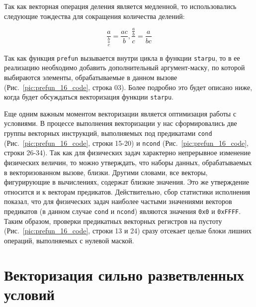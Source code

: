 \documentclass[utf8]{psta}
\begin{document}
Так как векторная операция деления является медленной, то использовались следующие тождества для сокращения количества делений:

\begin{equation}\label{eq:deldel}
\frac{a}{\frac{b}{c}} = \frac{ac}{b}, \frac{\frac{a}{b}}{c} = \frac{a}{bc}
\end{equation} 

Так как функция \texttt{prefun} вызывается внутри цикла в функции \texttt{starpu}, то в ее реализацию необходимо добавить дополнительный аргумент-маску, по которой выбираются элементы, обрабатываемые в данном вызове (Рис.~\ref{pic:prefun_16_code}, строка 03).
Более подробно это будет описано ниже, когда будет обсуждаться векторизация функции \texttt{starpu}.

Еще одним важным моментом векторизации является оптимизация работы с условиями.
В процессе выполнения векторизации у нас сформировались две группы векторных инструкций, выполняемых под предикатами \texttt{cond} (Рис.~\ref{pic:prefun_16_code}, строки 15-20) и \texttt{ncond} (Рис.~\ref{pic:prefun_16_code}, строки 26-34).
Так как для физических задач характерно непрерывное изменение физических величин, то можно утверждать, что наборы данных, обрабатываемых в векторизованном вызове, близки.
Другими словами, все векторы, фигурирующие в вычислениях, содержат близкие значения.
Это же утверждение относится и к векторам предикатов.
Действительно, сбор статистики исполнения показал, что для физических задач наиболее частыми значениями векторов предикатов (в данном случае \texttt{cond} и \texttt{ncond}) являются значения \texttt{0x0} и \texttt{0xFFFF}.
Таким образом, проверки предикатных векторных регистров на пустоту (Рис.~\ref{pic:prefun_16_code}, строки 13 и 24) сразу отсекает целые блоки лишних операций, выполняемых с нулевой маской.

\section{Векторизация сильно разветвленных условий}
\end{document}
